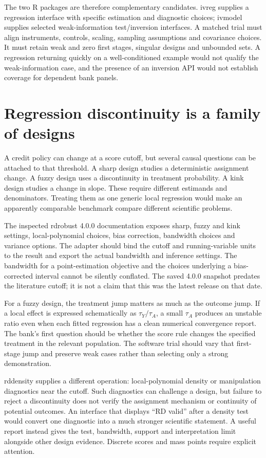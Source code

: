 The two R packages are therefore complementary candidates. ivreg supplies a
regression interface with specific estimation and diagnostic choices; ivmodel
supplies selected weak-information test/inversion interfaces. A matched trial
must align instruments, controls, scaling, sampling assumptions and covariance
choices. It must retain weak and zero first stages, singular designs and
unbounded sets. A regression returning quickly on a well-conditioned example
would not qualify the weak-information case, and the presence of an inversion
API would not establish coverage for dependent bank panels.

\section{Regression discontinuity is a family of designs}

A credit policy can change at a score cutoff, but several causal questions can
be attached to that threshold. A sharp design studies a deterministic assignment
change. A fuzzy design uses a discontinuity in treatment probability. A kink
design studies a change in slope. These require different estimands and
denominators. Treating them as one generic local regression would make an
apparently comparable benchmark compare different scientific problems.

The inspected rdrobust 4.0.0 documentation exposes sharp, fuzzy and kink
settings, local-polynomial choices, bias correction, bandwidth choices and
variance options. The adapter should bind the cutoff and running-variable
units to the result and export the actual bandwidth and inference settings.
The bandwidth for a point-estimation objective and the choices underlying a
bias-corrected interval cannot be silently conflated. The saved 4.0.0 snapshot
predates the literature cutoff; it is not a claim that this was the latest
release on that date.\cite{rdrobust}

For a fuzzy design, the treatment jump matters as much as the outcome jump.
If a local effect is expressed schematically as \(\tau_Y/\tau_A\), a small
\(\tau_A\) produces an unstable ratio even when each fitted regression has a
clean numerical convergence report. The bank's first question should be
whether the score rule changes the specified treatment in the relevant
population. The software trial should vary that first-stage jump and preserve
weak cases rather than selecting only a strong demonstration.

rddensity supplies a different operation: local-polynomial density or
manipulation diagnostics near the cutoff. Such diagnostics can challenge a
design, but failure to reject a discontinuity does not verify the assignment
mechanism or continuity of potential outcomes. An interface that displays
``RD valid'' after a density test would convert one diagnostic into a much
stronger scientific statement. A useful report instead gives the test,
bandwidth, support and interpretation limit alongside other design evidence.
Discrete scores and mass points require explicit attention.\cite{rddensity}

